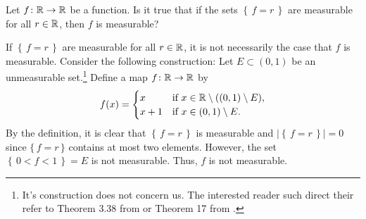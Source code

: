\begin{problem}
  Let $f\colon\mathbb{R}\to\mathbb{R}$ be a function. Is it true that if the sets
  $\left\{\,f=r\,\right\}$ are measurable for all $r\in\mathbb{R}$, then $f$ is
  measurable?
\end{problem}
\begin{solution}
  If $\left\{\,f=r\,\right\}$ are measurable for all $r\in\mathbb{R}$, it is not
  necessarily the case that $f$ is measurable. Consider the following
  construction: Let $E\subset(0,1)$ be an unmeasurable set.\footnote{It's
    construction does not concern us. The interested reader such direct
    their refer to Theorem 3.38 from \cite[Ch.\@ 3, p.\@
    57-58]{wheeden-zygmund} or Theorem 17 from \cite[Ch.\@ 2\S 7, p.\@
    48]{royden}.} Define a map $f\colon\mathbb{R}\to\mathbb{R}$ by
  \begin{equation}
    \label{eq:prep:1:11}
    f(x)=
    \begin{cases}
      x&\text{if $x\in\mathbb{R}\setminus((0,1)\setminus E)$},\\
      x+1&\text{if $x\in (0,1)\setminus E$.}
    \end{cases}
  \end{equation}
  By the definition, it is clear that $\left\{\,f=r\,\right\}$ is
  measurable and $\left|\left\{\,f=r\,\right\}\right|=0$ since
  $\{\,f=r\,\}$ contains at most two elements. However, the set
  $\left\{\,0<f<1\,\right\}=E$ is not measurable. Thus, $f$ is not
  measurable.
\end{solution}

